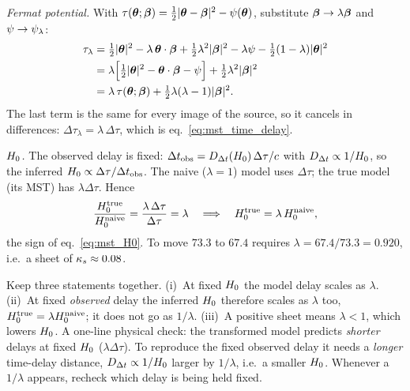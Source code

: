 \begin{derivation}
\textit{Fermat potential.}  With
$\tau(\boldsymbol{\theta};\boldsymbol{\beta}) = \tfrac12|\boldsymbol{\theta}-\boldsymbol{\beta}|^2 - \psi(\boldsymbol{\theta})$,
substitute $\boldsymbol{\beta} \to \lambda\boldsymbol{\beta}$ and $\psi \to \psi_\lambda$:
\begin{align*}
  \tau_\lambda
  &= \tfrac12|\boldsymbol{\theta}|^2 - \lambda\,\boldsymbol{\theta}\cdot\boldsymbol{\beta} + \tfrac12\lambda^2|\boldsymbol{\beta}|^2
     - \lambda\psi - \tfrac12(1-\lambda)|\boldsymbol{\theta}|^2\\
  &= \lambda\Big[\tfrac12|\boldsymbol{\theta}|^2 - \boldsymbol{\theta}\cdot\boldsymbol{\beta} - \psi\Big] + \tfrac12\lambda^2|\boldsymbol{\beta}|^2\\
  &= \lambda\,\tau(\boldsymbol{\theta};\boldsymbol{\beta}) + \tfrac12\lambda(\lambda-1)|\boldsymbol{\beta}|^2 .
\end{align*}
The last term is the same for every image of the source, so it cancels in
differences: $\Delta\tau_\lambda = \lambda\,\Delta\tau$, which is
eq.~\eqref{eq:mst_time_delay}.

\textit{$H_0$.}  The observed delay is fixed:
$\Delta t_{\mathrm{obs}} = D_{\Delta t}(H_0)\,\Delta\tau/c$
with $D_{\Delta t} \propto 1/H_0$, so the inferred
$H_0 \propto \Delta\tau/\Delta t_{\mathrm{obs}}$.  The naive
($\lambda = 1$) model uses $\Delta\tau$; the true model (its MST) has
$\lambda\Delta\tau$.  Hence
\[
  \frac{H_0^{\mathrm{true}}}{H_0^{\mathrm{naive}}}
  = \frac{\lambda\,\Delta\tau}{\Delta\tau} = \lambda
  \quad\Longrightarrow\quad
  H_0^{\mathrm{true}} = \lambda\,H_0^{\mathrm{naive}},
\]
the sign of eq.~\eqref{eq:mst_H0}.  To move $73.3$ to $67.4$ requires
$\lambda = 67.4/73.3 = 0.920$, i.e.\ a sheet of $\kappa_s \approx 0.08$.
\end{derivation}

\begin{annotation}
Keep three statements together.  (i)~At fixed $H_0$ the model delay scales
as $\lambda$.  (ii)~At fixed \emph{observed} delay the inferred $H_0$
therefore scales as $\lambda$ too, $H_0^{\mathrm{true}} =
\lambda H_0^{\mathrm{naive}}$; it does not go as $1/\lambda$.  (iii)~A
positive sheet means $\lambda < 1$, which lowers $H_0$.  A one-line
physical check: the transformed model predicts \emph{shorter} delays at fixed
$H_0$ ($\lambda\Delta\tau$).  To reproduce the fixed observed delay it
needs a \emph{longer} time-delay distance, $D_{\Delta t} \propto 1/H_0$
larger by $1/\lambda$, i.e.\ a smaller $H_0$.  Whenever a $1/\lambda$
appears, recheck which delay is being held fixed.
\end{annotation}


